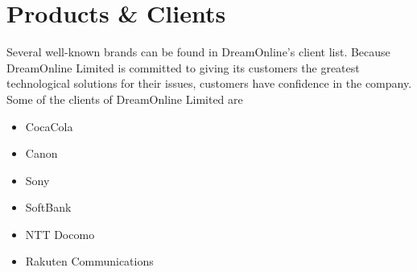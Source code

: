 \section{Products \& Clients}
\begin{flushleft}
    Several well-known brands can be found in DreamOnline's client list. Because
DreamOnline Limited is committed to giving its customers the greatest technological
solutions for their issues, customers have confidence in the company. Some of the
clients of DreamOnline Limited are \\
\vspace{12pt}
\begin{itemize}
    \item CocaCola
\item Canon
\item Sony
\item SoftBank
\item NTT Docomo
\item Rakuten Communications
\end{itemize}


\end{flushleft}
